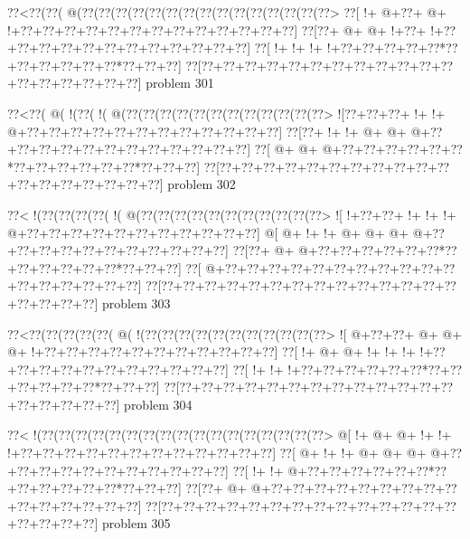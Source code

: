 \vbox{\vbox{\goo
\0??<\0??(\0??(\- @(\0??(\0??(\0??(\0??(\0??(\0??(\0??(\0??(\0??(\0??(\0??(\0??(\0??(\0??(\0??>
\0??[\- !+\- @+\0??+\- @+\- !+\0??+\0??+\0??+\0??+\0??+\0??+\0??+\0??+\0??+\0??+\0??+\0??+\0??]
\0??[\0??+\- @+\- @+\- !+\0??+\- !+\0??+\0??+\0??+\0??+\0??+\0??+\0??+\0??+\0??+\0??+\0??+\0??]
\0??[\- !+\- !+\- !+\- !+\0??+\0??+\0??+\0??+\0??*\0??+\0??+\0??+\0??+\0??+\0??*\0??+\0??+\0??]
\0??[\0??+\0??+\0??+\0??+\0??+\0??+\0??+\0??+\0??+\0??+\0??+\0??+\0??+\0??+\0??+\0??+\0??+\0??]
}
\hfil problem 301\hfil\break
}



\vbox{\vbox{\goo
\0??<\0??(\- @(\- !(\0??(\- !(\- @(\0??(\0??(\0??(\0??(\0??(\0??(\0??(\0??(\0??(\0??(\0??(\0??>
\- ![\0??+\0??+\0??+\- !+\- !+\- @+\0??+\0??+\0??+\0??+\0??+\0??+\0??+\0??+\0??+\0??+\0??+\0??]
\0??[\0??+\- !+\- !+\- @+\- @+\- @+\0??+\0??+\0??+\0??+\0??+\0??+\0??+\0??+\0??+\0??+\0??+\0??]
\0??[\- @+\- @+\- @+\0??+\0??+\0??+\0??+\0??+\0??*\0??+\0??+\0??+\0??+\0??+\0??*\0??+\0??+\0??]
\0??[\0??+\0??+\0??+\0??+\0??+\0??+\0??+\0??+\0??+\0??+\0??+\0??+\0??+\0??+\0??+\0??+\0??+\0??]
}
\hfil problem 302\hfil\break
}



\vbox{\vbox{\goo
\0??<\- !(\0??(\0??(\0??(\0??(\- !(\- @(\0??(\0??(\0??(\0??(\0??(\0??(\0??(\0??(\0??(\0??(\0??>
\- ![\- !+\0??+\0??+\- !+\- !+\- !+\- @+\0??+\0??+\0??+\0??+\0??+\0??+\0??+\0??+\0??+\0??+\0??]
\- @[\- @+\- !+\- !+\- @+\- @+\- @+\- @+\0??+\0??+\0??+\0??+\0??+\0??+\0??+\0??+\0??+\0??+\0??]
\0??[\0??+\- @+\- @+\0??+\0??+\0??+\0??+\0??+\0??*\0??+\0??+\0??+\0??+\0??+\0??*\0??+\0??+\0??]
\0??[\- @+\0??+\0??+\0??+\0??+\0??+\0??+\0??+\0??+\0??+\0??+\0??+\0??+\0??+\0??+\0??+\0??+\0??]
\0??[\0??+\0??+\0??+\0??+\0??+\0??+\0??+\0??+\0??+\0??+\0??+\0??+\0??+\0??+\0??+\0??+\0??+\0??]
}
\hfil problem 303\hfil\break
}



\vbox{\vbox{\goo
\0??<\0??(\0??(\0??(\0??(\0??(\- @(\- !(\0??(\0??(\0??(\0??(\0??(\0??(\0??(\0??(\0??(\0??(\0??>
\- ![\- @+\0??+\0??+\- @+\- @+\- @+\- !+\0??+\0??+\0??+\0??+\0??+\0??+\0??+\0??+\0??+\0??+\0??]
\0??[\- !+\- @+\- @+\- !+\- !+\- !+\- !+\0??+\0??+\0??+\0??+\0??+\0??+\0??+\0??+\0??+\0??+\0??]
\0??[\- !+\- !+\- !+\0??+\0??+\0??+\0??+\0??+\0??*\0??+\0??+\0??+\0??+\0??+\0??*\0??+\0??+\0??]
\0??[\0??+\0??+\0??+\0??+\0??+\0??+\0??+\0??+\0??+\0??+\0??+\0??+\0??+\0??+\0??+\0??+\0??+\0??]
}
\hfil problem 304\hfil\break
}



\vbox{\vbox{\goo
\0??<\- !(\0??(\0??(\0??(\0??(\0??(\0??(\0??(\0??(\0??(\0??(\0??(\0??(\0??(\0??(\0??(\0??(\0??>
\- @[\- !+\- @+\- @+\- !+\- !+\- !+\0??+\0??+\0??+\0??+\0??+\0??+\0??+\0??+\0??+\0??+\0??+\0??]
\0??[\- @+\- !+\- !+\- @+\- @+\- @+\- @+\0??+\0??+\0??+\0??+\0??+\0??+\0??+\0??+\0??+\0??+\0??]
\0??[\- !+\- !+\- @+\0??+\0??+\0??+\0??+\0??+\0??*\0??+\0??+\0??+\0??+\0??+\0??*\0??+\0??+\0??]
\0??[\0??+\- @+\- @+\0??+\0??+\0??+\0??+\0??+\0??+\0??+\0??+\0??+\0??+\0??+\0??+\0??+\0??+\0??]
\0??[\0??+\0??+\0??+\0??+\0??+\0??+\0??+\0??+\0??+\0??+\0??+\0??+\0??+\0??+\0??+\0??+\0??+\0??]
}
\hfil problem 305\hfil\break
}



